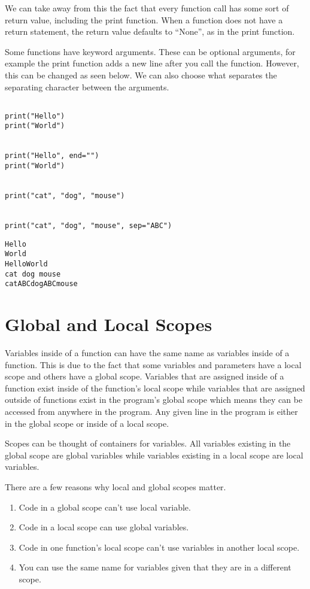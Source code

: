 \documentclass[11pt]{article}
\begin{document}
We can take away from this the fact that every function call has some sort of return value, including the print function. When a function does not have a return statement, the return value defaults to ``None'', as in the print function.


Some functions have keyword arguments. These can be optional arguments, for example the print function adds a new line after you call the function. However, this can be changed as seen below. We can also choose what separates the separating character between the arguments.


\begin{verbatim}

print("Hello")
print("World")


print("Hello", end="")
print("World")


print("cat", "dog", "mouse")


print("cat", "dog", "mouse", sep="ABC")

\end{verbatim}

\begin{verbatim}
Hello
World
HelloWorld
cat dog mouse
catABCdogABCmouse
\end{verbatim}

\section{Global and Local Scopes}
\label{sec:orgdb339ef}

Variables inside of a function can have the same name as variables inside of a function. This is due to the fact that some variables and parameters have a local scope and others have a global scope. Variables that are assigned inside of a function exist inside of the function's local scope while variables that are assigned outside of functions exist in the program's global scope which means they can be accessed from anywhere in the program. Any given line in the program is either in the global scope or inside of a local scope.

Scopes can be thought of containers for variables. All variables existing in the global scope are global variables while variables existing in a local scope are local variables.

There are a few reasons why local and global scopes matter.

\begin{enumerate}
\item Code in a global scope can't use local variable.
\item Code in a local scope can use global variables.
\item Code in one function's local scope can't use variables in another local scope.
\item You can use the same name for variables given that they are in a different scope.
\end{enumerate}
\end{document}

